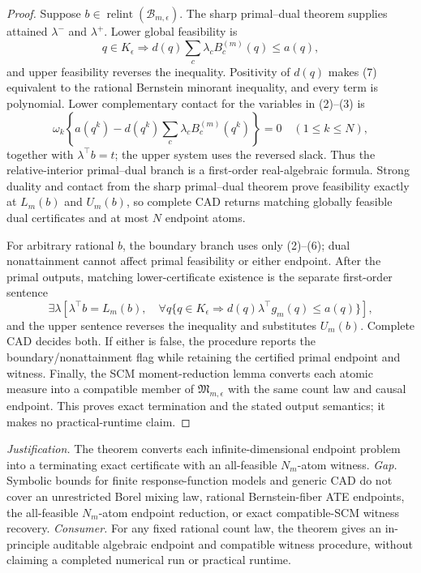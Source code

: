 \documentclass{article}
\begin{document}
\begin{proof}
Suppose \(b\in\operatorname{relint}(\mathcal B_{m,\epsilon})\).  The sharp primal--dual theorem supplies attained \(\lambda^-\) and \(\lambda^+\).  Lower global feasibility is
\[
 q\in K_{\epsilon}\Longrightarrow
 d(q)\sum_c\lambda_cB_c^{(m)}(q)\leq a(q),
\tag{7}
\]
and upper feasibility reverses the inequality.  Positivity of \(d(q)\) makes (7) equivalent to the rational Bernstein minorant inequality, and every term is polynomial.  Lower complementary contact for the variables in (2)--(3) is
\[
 \omega_k\left\{a(q^k)-d(q^k)\sum_c\lambda_cB_c^{(m)}(q^k)\right\}=0
 \quad(1\leq k\leq N),
\tag{8}
\]
together with \(\lambda^{\top}b=t\); the upper system uses the reversed slack.  Thus the relative-interior primal--dual branch is a first-order real-algebraic formula.  Strong duality and contact from the sharp primal--dual theorem prove feasibility exactly at \(L_m(b)\) and \(U_m(b)\), so complete CAD returns matching globally feasible dual certificates and at most \(N\) endpoint atoms.

For arbitrary rational \(b\), the boundary branch uses only (2)--(6); dual nonattainment cannot affect primal feasibility or either endpoint.  After the primal outputs, matching lower-certificate existence is the separate first-order sentence
\[
 \exists\lambda\left[
 \lambda^{\top}b=L_m(b),\quad
 \forall q\{q\in K_{\epsilon}\Rightarrow d(q)\lambda^{\top}g_m(q)\leq a(q)\}
 \right],
\tag{9}
\]
and the upper sentence reverses the inequality and substitutes \(U_m(b)\).  Complete CAD decides both.  If either is false, the procedure reports the boundary/nonattainment flag while retaining the certified primal endpoint and witness.  Finally, the SCM moment-reduction lemma converts each atomic measure into a compatible member of \(\mathfrak M_{m,\epsilon}\) with the same count law and causal endpoint.  This proves exact termination and the stated output semantics; it makes no practical-runtime claim.
\end{proof}
\par\smallskip\noindent \textit{Justification.} The theorem converts each infinite-dimensional endpoint problem into a terminating exact certificate with an all-feasible \(N_m\)-atom witness. \textit{Gap.} Symbolic bounds for finite response-function models and generic CAD do not cover an unrestricted Borel mixing law, rational Bernstein-fiber ATE endpoints, the all-feasible \(N_m\)-atom endpoint reduction, or exact compatible-SCM witness recovery. \textit{Consumer.} For any fixed rational count law, the theorem gives an in-principle auditable algebraic endpoint and compatible witness procedure, without claiming a completed numerical run or practical runtime.
\end{document}

